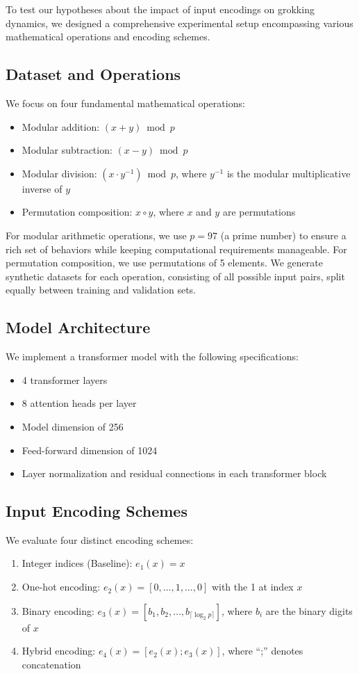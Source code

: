 \documentclass{article} %
\begin{document}
To test our hypotheses about the impact of input encodings on grokking dynamics, we designed a comprehensive experimental setup encompassing various mathematical operations and encoding schemes.

\subsection{Dataset and Operations}
We focus on four fundamental mathematical operations:
\begin{itemize}
    \item Modular addition: $(x + y) \bmod p$
    \item Modular subtraction: $(x - y) \bmod p$
    \item Modular division: $(x \cdot y^{-1}) \bmod p$, where $y^{-1}$ is the modular multiplicative inverse of $y$
    \item Permutation composition: $x \circ y$, where $x$ and $y$ are permutations
\end{itemize}

For modular arithmetic operations, we use $p = 97$ (a prime number) to ensure a rich set of behaviors while keeping computational requirements manageable. For permutation composition, we use permutations of 5 elements. We generate synthetic datasets for each operation, consisting of all possible input pairs, split equally between training and validation sets.

\subsection{Model Architecture}
We implement a transformer model with the following specifications:
\begin{itemize}
    \item 4 transformer layers
    \item 8 attention heads per layer
    \item Model dimension of 256
    \item Feed-forward dimension of 1024
    \item Layer normalization and residual connections in each transformer block
\end{itemize}

\subsection{Input Encoding Schemes}
We evaluate four distinct encoding schemes:
\begin{enumerate}
    \item Integer indices (Baseline): $e_1(x) = x$
    \item One-hot encoding: $e_2(x) = [0, \ldots, 1, \ldots, 0]$ with the 1 at index $x$
    \item Binary encoding: $e_3(x) = [b_1, b_2, \ldots, b_{\lceil \log_2 p \rceil}]$, where $b_i$ are the binary digits of $x$
    \item Hybrid encoding: $e_4(x) = [e_2(x); e_3(x)]$, where ``;'' denotes concatenation
\end{enumerate}
\end{document}
